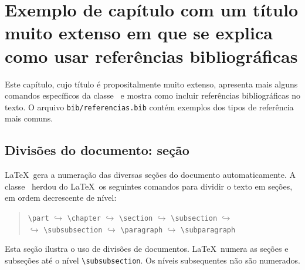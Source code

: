 
\chapter[Exemplo de capítulo com um título muito extenso...]
		{Exemplo de capítulo com um título muito extenso em que se explica
		como usar referências bibliográficas}

Este capítulo, cujo título é propositalmente muito extenso, 
apresenta mais alguns comandos específicos da classe \abnTeX\ e 
mostra como incluir referências bibliográficas no texto. O arquivo
\texttt{bib/referencias.bib} contém exemplos dos tipos de referência
mais comuns.

\section{Divisões do documento: seção}\label{sec-divisoes}

\LaTeX\ gera a numeração das diversas seções do documento automaticamente. A
classe \abnTeX\ herdou do \LaTeX\ os seguintes comandos para 
dividir o texto em seções, em ordem decrescente de nível:
	\begin{quotation}
	\verb|\part| $\hookrightarrow$ \verb|\chapter| 
	$\hookrightarrow$ \verb|\section| $\hookrightarrow$ \verb|\subsection| 
	$\hookrightarrow$ \\
	$\hookrightarrow$ \verb|\subsubsection| $\hookrightarrow$ \verb|\paragraph| 
	$\hookrightarrow$ \verb|\subparagraph|
	\end{quotation}
Esta seção ilustra o uso de divisões de documentos. \LaTeX\ numera
as seções e subseções até o nível \verb|\subsubsection|. Os níveis
subsequentes não são numerados.

